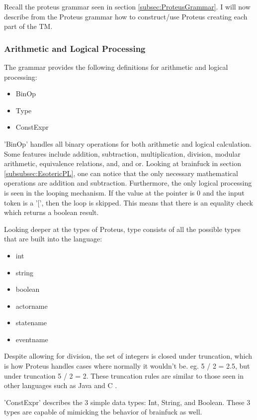 Recall the proteus grammar seen in section \ref{subsec:ProteusGrammar}.
I will now describe from the Proteus grammar how to construct/use Proteus creating each part of the TM.

\subsubsection{Arithmetic and Logical Processing}\label{subsubsec:ArithLogProc}

The grammar provides the following definitions for arithmetic and logical processing:
\begin{itemize}
    \item BinOp
    \item Type
    \item ConstExpr
\end{itemize}

'BinOp' handles all binary operations for both arithmetic and logical calculation.
Some features include addition, subtraction, multiplication, division, modular arithmetic, equivalence relations, and, and or.
Looking at brainfuck in section \ref{subsubsec:EsotericPL}, one can notice that the only necessary mathematical operations are addition and subtraction.
Furthermore, the only logical processing is seen in the looping mechanism.
If the value at the pointer is 0 and the input token is a '[', then the loop is skipped.
This means that there is an equality check which returns a boolean result.

Looking deeper at the types of Proteus, type consists of all the possible types that are built into the language:
\begin{itemize}
    \item int
    \item string
    \item boolean
    \item actorname
    \item statename
    \item eventname
\end{itemize}

Despite allowing for division, the set of integers is closed under truncation, which is how Proteus handles cases where normally it wouldn't be.
eg. 5 / 2 = 2.5, but under truncation 5 / 2 = 2.
These truncation rules are similar to those seen in other languages such as Java and C \cite{TruncJava,TruncC}.

'ConstExpr' describes the 3 simple data types: Int, String, and Boolean.
These 3 types are capable of mimicking the behavior of brainfuck as well.

